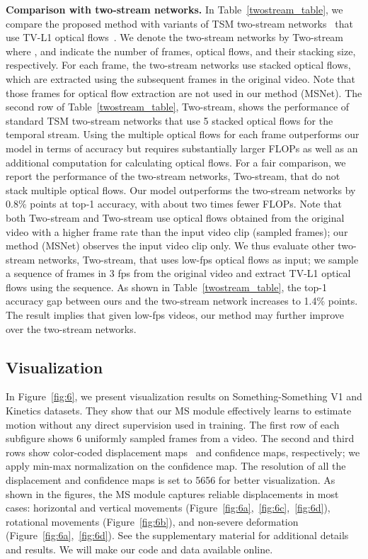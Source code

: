 \documentclass[runningheads]{llncs}
\begin{document}
\smallbreak
\noindent
\textbf{Comparison with two-stream networks.}
In Table~\ref{twostream_table}, we compare the proposed method with variants of TSM two-stream networks~\cite{simonyan2014two} that use TV-L1 optical flows~\cite{zach2007duality}.
We denote the two-stream networks by Two-stream where ,  and  indicate the number of frames, optical flows, and their stacking size, respectively.
For each frame, the two-stream networks use  stacked optical flows, which are extracted using the subsequent frames in the original video.
Note that those frames for optical flow extraction are not used in our method (MSNet). 
The second row of Table~\ref{twostream_table}, Two-stream, shows the performance of standard TSM two-stream networks that use 5 stacked optical flows for the temporal stream.
Using the multiple optical flows for each frame outperforms our model in terms of accuracy but requires substantially larger FLOPs as well as an additional computation for calculating optical flows. 
For a fair comparison, we report the performance of the two-stream networks, Two-stream, that do not stack multiple optical flows.
Our model outperforms the two-stream networks by 0.8\% points at top-1 accuracy, with about two times fewer FLOPs.
Note that both Two-stream and Two-stream use optical flows obtained from the original video with a higher frame rate than the input video clip (sampled frames); our method (MSNet) observes the input video clip only.  
We thus evaluate other two-stream networks, Two-stream, that uses low-fps optical flows as input; we sample a sequence of frames in 3 fps from the original video and extract TV-L1 optical flows using the sequence. 
As shown in Table~\ref{twostream_table}, the top-1 accuracy gap between ours and the two-stream network increases to 1.4\% points. The result implies that given low-fps videos, our method may further improve over the two-stream networks.   


\subsection{Visualization}
In Figure~\ref{fig:6}, we present visualization results on Something-Something V1 and Kinetics datasets.
They show that our MS module effectively learns to estimate motion without any direct supervision used in training. 
The first row of each subfigure shows 6 uniformly sampled frames from a video.
The second and third rows show color-coded displacement maps~\cite{baker2011database} and confidence maps, respectively; we apply min-max normalization on the confidence map.
The resolution of all the displacement and confidence maps is set to 5656 for better visualization.
As shown in the figures, the MS module captures reliable displacements in most cases: horizontal and vertical movements (Figure~\ref{fig:6a},~\ref{fig:6c},~\ref{fig:6d}), rotational movements (Figure~\ref{fig:6b}), and non-severe deformation (Figure~\ref{fig:6a},~\ref{fig:6d}).
See the supplementary material for additional details and results. We will make our code and data available online.
\end{document}
